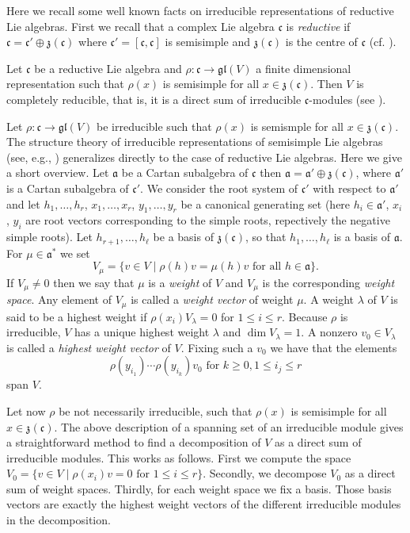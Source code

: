 \documentclass[a4paper,10pt]{amsart}
\newcommand{\mf}{\mathfrak}
\newcommand{\gl}{\mf{gl}}
\renewcommand{\a}{\mf{a}}
\renewcommand{\c}{\mf{c}}
\newcommand{\z}{\mf{z}}
\numberwithin{equation}{section}
\theoremstyle{remark}
\theoremstyle{remark}
\begin{document}
Here we recall some well known facts on irreducible representations of
reductive Lie algebras. First we recall that a complex Lie algebra $\c$ is
{\em reductive} if $\c = \c'\oplus \z(\c)$ where $\c'=[\c,\c]$ is semisimple and
$\z(\c)$ is the centre of $\c$ (cf. \cite[\S 19.1]{hum}).

Let $\c$ be a reductive Lie algebra and $\rho : \c \to \gl(V)$ a finite
dimensional representation such that $\rho(x)$ is semisimple for all $x\in
\z(\c)$. Then $V$ is completely reducible, that is, it is a direct sum of
irreducible $\c$-modules (see \cite[Chapter III, Theorem 10]{jac}).

Let $\rho : \c \to \gl(V)$ be irreducible such that $\rho(x)$ is semismple  
for all $x\in \z(\c)$. The structure theory of irreducible
representations of semisimple Lie algebras (see, e.g., \cite[\S 20]{hum})
generalizes directly to the case of reductive Lie algebras. Here we give a 
short overview. Let $\a$ be
a Cartan subalgebra of $\c$ then $\a = \a'\oplus \z(\c)$, where $\a'$
is a Cartan subalgebra of $\c'$. We consider the root system of $\c'$ with
respect to $\a'$ and let $h_1,\ldots,h_r$, $x_1,\ldots,x_r$,
$y_1,\ldots,y_r$ be a canonical generating set (here $h_i\in \a'$,
$x_i$, $y_i$ are root vectors corresponding to the simple roots,
repectively the negative simple roots). Let $h_{r+1},\ldots,h_\ell$ be a basis
of $\z(\c)$, so that $h_1,\ldots,h_\ell$ is a basis of $\a$. For $\mu\in
\a^*$ we set
$$V_\mu = \{ v\in V \mid \rho(h)v = \mu(h)v \text{ for all } h\in \a\}.$$
If $V_\mu\neq 0$ then we say that $\mu$ is a {\em weight} of $V$ and
$V_\mu$ is the corresponding {\em weight space}. Any element of $V_\mu$ is
called a {\em weight vector} of weight $\mu$. A weight $\lambda$ of $V$ is
said to be a highest weight if $\rho(x_i)V_\lambda =0$ for $1\leq i\leq r$.
Because $\rho$ is irreducible, $V$ has a unique highest weight $\lambda$
and $\dim V_\lambda=1$. A nonzero $v_0\in V_\lambda$ is called a
{\em highest weight vector} of $V$. Fixing such a $v_0$ we have that the
elements
$$\rho(y_{i_1})\cdots \rho(y_{i_k}) v_0\text{ for } k\geq 0, 1\leq i_j\leq r$$
span $V$.

Let now $\rho$ be not necessarily irreducible, such that $\rho(x)$ is
semisimple for all $x\in \z(\c)$. The above description of a spanning set
of an irreducible module gives a straightforward method to find a decomposition
of $V$ as a direct sum of irreducible modules. This works as follows. First
we compute the space $V_0 = \{ v\in V \mid \rho(x_i)v = 0 \text{ for }
1\leq i\leq r\}$. Secondly, we decompose $V_0$ as a direct sum of weight spaces.
Thirdly, for each weight space we fix a basis. Those basis vectors are
exactly the highest weight vectors of the different irreducible modules in
the decomposition.
\end{document}
